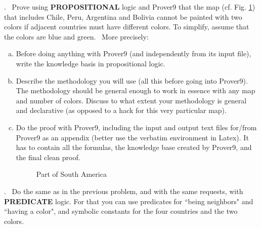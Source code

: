 \documentclass[fullapage,12pt]{article}
\begin{document}
. \ Prove using {\bf PROPOSITIONAL} logic and Prover9 that the map (cf. Fig. \ref{fig:map}) that includes Chile, Peru,
Argentina and Bolivia cannot be painted with two colors if adjacent countries must have different colors.
To simplify, assume that the colors are blue and green. \ More precisely:
\begin{enumerate}[(a)]
\item  Before doing anything with Prover9 (and independently from its input file), write the knowledge basis in propositional logic. 
\item Describe the methodology you will use (all this before going into Prover9). The methodology should be general enough to work in essence with any map and number of colors.
Discuss to what extent your methodology is general and declarative (as opposed to a hack for this very particular map). 

\item Do the proof with Prover9, including the input and output text files for/from Prover9 as an appendix (better use the verbatim environment in Latex).
It has to contain all the formulas, the knowledge base created by Prover9, and the final clean proof.


\begin{figure}[h]
\begin{center}
\caption{Part of South America}\label{fig:map}
\end{center}
\end{figure}

\end{enumerate}

. \ Do the same as in the previous problem, and with the same requests, with {\bf PREDICATE} logic. For that you can use predicates for ``being neighbors" and ``having a color", 
and symbolic constants for the four countries and the two colors.\\

\end{document}

